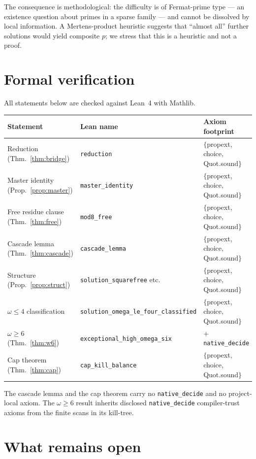 \documentclass[11pt,reqno]{amsart}
\theoremstyle{plain}
\theoremstyle{definition}
\begin{document}
\noindent The consequence is methodological: the difficulty is of Fermat-prime type --- an
existence question about primes in a sparse family --- and cannot be dissolved by local
information. A Mertens-product heuristic suggests that ``almost all'' further solutions would
yield composite $p$; we stress that this is a heuristic and not a proof.

\section{Formal verification}\label{sec:lean}

All statements below are checked against Lean~4 with Mathlib.

\begin{center}
\begin{tabular}{@{}lll@{}}
\hline
Statement & Lean name & Axiom footprint\\
\hline
Reduction (Thm.~\ref{thm:bridge}) & \texttt{reduction} & $\{$propext, choice, Quot.sound$\}$\\
Master identity (Prop.~\ref{prop:master}) & \texttt{master\_identity} & $\{$propext, choice, Quot.sound$\}$\\
Free residue clause (Thm.~\ref{thm:free}) & \texttt{mod8\_free} & $\{$propext, choice, Quot.sound$\}$\\
Cascade lemma (Thm.~\ref{thm:cascade}) & \texttt{cascade\_lemma} & $\{$propext, choice, Quot.sound$\}$\\
Structure (Prop.~\ref{prop:struct}) & \texttt{solution\_squarefree} etc. & $\{$propext, choice, Quot.sound$\}$\\
$\omega\le4$ classification & \texttt{solution\_omega\_le\_four\_classified} & $\{$propext, choice, Quot.sound$\}$\\
$\omega\ge6$ (Thm.~\ref{thm:w6}) & \texttt{exceptional\_high\_omega\_six} & $+$ \texttt{native\_decide}\\
Cap theorem (Thm.~\ref{thm:cap}) & \texttt{cap\_kill\_balance} & $\{$propext, choice, Quot.sound$\}$\\
\hline
\end{tabular}
\end{center}

\noindent The cascade lemma and the cap theorem carry no \texttt{native\_decide} and no
project-local axiom. The $\omega\ge6$ result inherits disclosed \texttt{native\_decide}
compiler-trust axioms from the finite scans in its kill-tree.

\section{What remains open}
\end{document}
